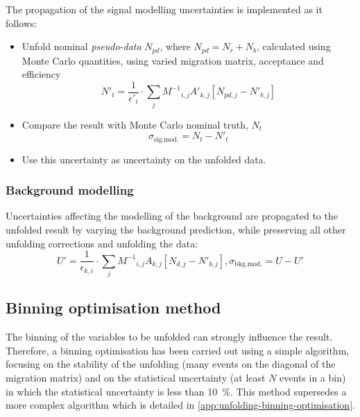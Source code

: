 The propagation of the signal modelling uncertainties is implemented as it follows:
\begin{itemize}
  \item Unfold nominal \emph{pseudo-data} \(N_{pd}\), where \(N_{pd}= N_{r} + N_{b}\), calculated using Monte Carlo quantities, using varied migration matrix, acceptance and efficiency
  \begin{equation}
    N'_{t} = \dfrac{1}{\epsilon'_{i}} \cdot \sum_{j} {M^{-1}}_{i,j} A'_{k,j} \left[ N_{pd, j} - N'_{b,j} \right]
  \end{equation}
  \item Compare the result with Monte Carlo nominal truth, \(N_{t}\)
  \begin{equation}
    \sigma_{\mathrm{sig. mod.}} = N_{t} - N'_{t}  %
  \end{equation}
  \item Use this uncertainty as uncertainty on the unfolded data.
\end{itemize}

\subsubsection{Background modelling}

Uncertainties affecting the modelling of the background are propagated to the unfolded result by varying the background prediction, while preserving all other unfolding corrections and unfolding the data:
\begin{equation}
  U' = \frac{1}{\epsilon_{k,i}} \cdot \sum_{j} {M^{-1}}_{i,j} A_{k,j} \left[ N_{d,j} - N'_{b,j} \right], \sigma_{\mathrm{bkg. mod.}} = U-U'  %
\end{equation}

\subsection{Binning optimisation method}
The binning of the variables to be unfolded can strongly influence the result. Therefore, a binning optimisation has been carried out using a simple algorithm, focusing on the stability of the unfolding (many events on the diagonal of the migration matrix) and on the statistical uncertainty (at least \(N\) events in a bin) in which the statistical uncertainty is less than \qty{10}{\%}. This method supersedes a more complex algorithm which is detailed in \cref{app:unfolding-binning-optimisation}.


